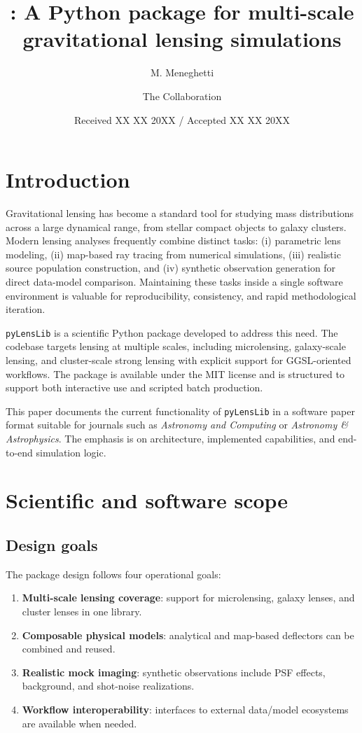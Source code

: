 \documentclass{aa}
\title{\pylenslib: A Python package for multi-scale gravitational lensing simulations}
\author{
M. Meneghetti\inst{1}
\and
The \pylenslib Collaboration\inst{1}
}
\institute{
INAF -- Osservatorio di Astrofisica e Scienza dello Spazio di Bologna, Via Piero Gobetti 93/3, 40129 Bologna, Italy
}
\date{Received XX XX 20XX / Accepted XX XX 20XX}
\newcommand{\pylenslib}{\texttt{pyLensLib}\xspace}
\begin{document}
\maketitle

\section{Introduction}
Gravitational lensing has become a standard tool for studying mass distributions across a large dynamical range, from stellar compact objects to galaxy clusters. Modern lensing analyses frequently combine distinct tasks: (i) parametric lens modeling, (ii) map-based ray tracing from numerical simulations, (iii) realistic source population construction, and (iv) synthetic observation generation for direct data-model comparison. Maintaining these tasks inside a single software environment is valuable for reproducibility, consistency, and rapid methodological iteration.

\pylenslib is a scientific Python package developed to address this need. The codebase targets lensing at multiple scales, including microlensing, galaxy-scale lensing, and cluster-scale strong lensing with explicit support for GGSL-oriented workflows. The package is available under the MIT license and is structured to support both interactive use and scripted batch production.

This paper documents the current functionality of \pylenslib in a software paper format suitable for journals such as \emph{Astronomy and Computing} or \emph{Astronomy \& Astrophysics}. The emphasis is on architecture, implemented capabilities, and end-to-end simulation logic.

\section{Scientific and software scope}
\subsection{Design goals}
The package design follows four operational goals:
\begin{enumerate}
\item \textbf{Multi-scale lensing coverage}: support for microlensing, galaxy lenses, and cluster lenses in one library.
\item \textbf{Composable physical models}: analytical and map-based deflectors can be combined and reused.
\item \textbf{Realistic mock imaging}: synthetic observations include PSF effects, background, and shot-noise realizations.
\item \textbf{Workflow interoperability}: interfaces to external data/model ecosystems are available when needed.
\end{enumerate}
\end{document}
